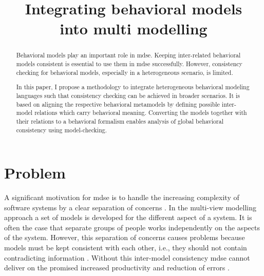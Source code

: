 \documentclass[conference]{IEEEtran}
\begin{document}
\title{Integrating behavioral models\\ into multi modelling}

\author{
}


\maketitle

\begin{abstract}
Behavioral models play an important role in \gls{mdse}.
Keeping inter-related behavioral models consistent is essential to use them in \gls{mdse} successfully. 
However, consistency checking for behavioral models, especially in a heterogeneous scenario, is limited.

In this paper, I propose a methodology to integrate heterogeneous behavioral modeling languages such that consistency checking can be achieved in broader scenarios.
It is based on aligning the respective behavioral metamodels by defining possible inter-model relations which carry behavioral meaning.
Converting the models together with their relations to a behavioral formalism enables analysis of global behavioral consistency using model-checking. 
\end{abstract}


\IEEEpeerreviewmaketitle



\section{Problem}
A significant motivation for \gls{mdse} is to handle the increasing complexity of software systems by a clear separation of concerns \cite{franceModeldrivenDevelopmentComplex2007}.
In the multi-view modelling approach a set of models is developed for the different aspect of a system.
It is often the case that separate groups of people works independently on the aspects of the system.
However, this separation of concerns causes problems because models must be kept consistent with each other, i.e., they should not contain contradicting information \cite{cicchettiMultiviewApproachesSoftware2019}.
Without this inter-model consistency \gls{mdse} cannot deliver on the promised increased productivity and reduction of errors \cite{brambillaModeldrivenSoftwareEngineering2017}.
\end{document}
